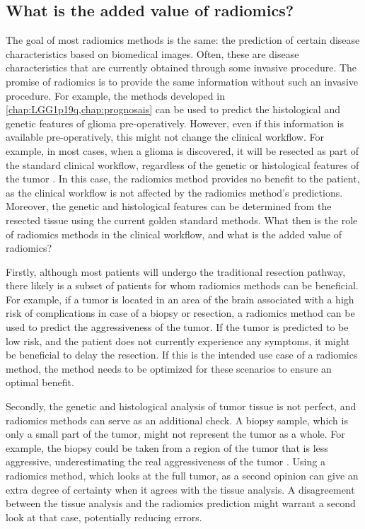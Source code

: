 \subsection{What is the added value of radiomics?}\label{subsec:discussion_added_value_radiomics}

The goal of most radiomics methods is the same: the prediction of certain disease characteristics based on biomedical images.
Often, these are disease characteristics that are currently obtained through some invasive procedure.
The promise of radiomics is to provide the same information without such an invasive procedure.
For example, the methods developed in \cref{chap:LGG1p19q,chap:prognosais} can be used to predict the histological and genetic features of glioma pre-operatively.
However, even if this information is available pre-operatively, this might not change the clinical workflow.
For example, in most cases, when a glioma is discovered, it will be resected as part of the standard clinical workflow, regardless of the genetic or histological features of the \gls{tumor} \autocite{welle2017gliomaguidelines,stupp2014hggguidelines}.
In this case, the radiomics method provides no benefit to the patient, as the clinical workflow is not affected by the radiomics method's predictions.
Moreover, the genetic and histological features can be determined from the resected tissue using the current golden standard methods.
What then is the role of radiomics methods in the clinical workflow, and what is the added value of radiomics?

Firstly, although most patients will undergo the traditional resection pathway, there likely is a subset of patients for whom radiomics methods can be beneficial.
For example, if a \gls{tumor} is located in an area of the brain associated with a high risk of complications in case of a biopsy or resection, a radiomics method can be used to predict the aggressiveness of the \gls{tumor}.
If the \gls{tumor} is predicted to be low risk, and the patient does not currently experience any symptoms, it might be beneficial to delay the resection.
If this is the intended use case of a radiomics method, the method needs to be optimized for these scenarios to ensure an optimal benefit.

Secondly, the genetic and histological analysis of \gls{tumor} tissue is not perfect, and radiomics methods can serve as an additional check.
A biopsy sample, which is only a small part of the \gls{tumor}, might not represent the \gls{tumor} as a whole.
For example, the biopsy could be taken from a region of the \gls{tumor} that is less aggressive, underestimating the real aggressiveness of the \gls{tumor} \autocite{muragaki2008biopsy}.
Using a radiomics method, which looks at the full \gls{tumor}, as a second opinion can give an extra degree of certainty when it agrees with the tissue analysis.
A disagreement between the tissue analysis and the radiomics prediction might warrant a second look at that case, potentially reducing errors.

